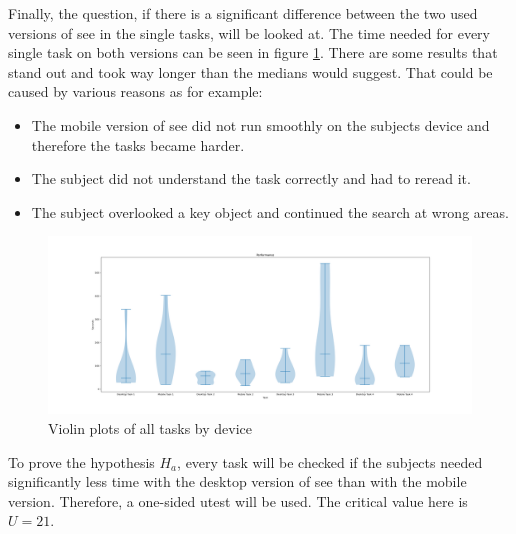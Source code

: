 Finally, the question, if there is a significant difference between the two used versions of \gls{see} in the single tasks, will be looked at.
The time needed for every single task on both versions can be seen in figure \ref{fig:speed_violin}.
There are some results that stand out and took way longer than the medians would suggest.
That could be caused by various reasons as for example:
\begin{itemize}
  \item The mobile version of \gls{see} did not run smoothly on the subjects device and therefore the tasks became harder.
  \item The subject did not understand the task correctly and had to reread it.
  \item The subject overlooked a key object and continued the search at wrong areas.
\end{itemize}

\begin{figure}
  \centering
  \includegraphics*[width=1.15\textwidth]{Evaluation/img/speed1_violin.png}
  \caption{Violin plots of all tasks by device}
  \label{fig:speed_violin}
\end{figure}

To prove the hypothesis $H_a$, every task will be checked if the subjects needed significantly less time with the desktop version of \gls{see} than with the mobile version.
Therefore, a one-sided \gls{utest} will be used.
The critical value here is $U = 21$.

